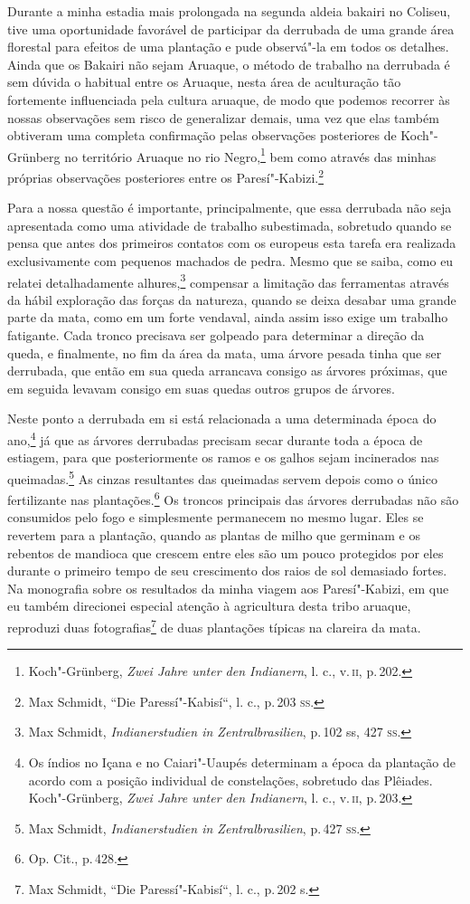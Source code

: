 Durante a minha estadia mais prolongada na segunda aldeia bakairi no
Coliseu, tive uma oportunidade favorável de participar da derrubada de
uma grande área florestal para efeitos de uma plantação e pude
observá"-la em todos os detalhes. Ainda que os Bakairi não sejam Aruaque,
o método de trabalho na derrubada é sem dúvida o habitual entre os
Aruaque, nesta área de aculturação tão fortemente influenciada pela
cultura aruaque, de modo que podemos recorrer às nossas observações sem
risco de generalizar demais, uma vez que elas também obtiveram uma
completa confirmação pelas observações posteriores de Koch"-Grünberg no
território Aruaque no rio Negro,\footnote{Koch"-Grünberg, \textit{Zwei Jahre
  unter den Indianern}, l. c., v.\,\textsc{ii}, p.\,202.} bem como através das
minhas próprias observações posteriores entre os Paresí"-Kabizi.\footnote{Max
  Schmidt, ``Die Paressí"-Kabisí``, l. c., p.\,203 \textsc{ss}.}

Para a nossa questão é importante, principalmente, que essa derrubada
não seja apresentada como uma atividade de trabalho subestimada,
sobretudo quando se pensa que antes dos primeiros contatos com os
europeus esta tarefa era realizada exclusivamente com pequenos machados
de pedra. Mesmo que se saiba, como eu relatei detalhadamente
alhures,\footnote{Max Schmidt, \textit{Indianerstudien in
  Zentralbrasilien}, p.\,102 ss, 427 \textsc{ss}.} compensar a limitação das
ferramentas através da hábil exploração das forças da natureza, quando
se deixa desabar uma grande parte da mata, como em um forte vendaval,
ainda assim isso exige um trabalho fatigante. Cada tronco precisava ser
golpeado para determinar a direção da queda, e finalmente, no fim da
área da mata, uma árvore pesada tinha que ser derrubada, que então em
sua queda arrancava consigo as árvores próximas, que em seguida levavam
consigo em suas quedas outros grupos de árvores.

Neste ponto a derrubada em si está relacionada a uma determinada época
do ano,\footnote{Os índios no Içana e no Caiari"-Uaupés determinam a época
  da plantação de acordo com a posição individual de constelações,
  sobretudo das Plêiades. Koch"-Grünberg, \textit{Zwei Jahre unter den
  Indianern}, l. c., v.\,\textsc{ii}, p.\,203.} já que as árvores derrubadas
precisam secar durante toda a época de estiagem, para que
posteriormente os ramos e os galhos sejam incinerados nas
queimadas.\footnote{Max Schmidt, \textit{Indianerstudien in
  Zentralbrasilien}, p.\,427 \textsc{ss}.} As cinzas resultantes das queimadas
servem depois como o único fertilizante nas plantações.\footnote{Op.
  Cit., p.\,428.} Os troncos principais das árvores derrubadas não são
consumidos pelo fogo e simplesmente permanecem no mesmo lugar. Eles se
revertem para a plantação, quando as plantas de milho que germinam e os
rebentos de mandioca que crescem entre eles são um pouco protegidos
por eles durante o primeiro tempo de seu crescimento dos raios de sol
demasiado fortes. Na monografia sobre os resultados da minha viagem aos
Paresí"-Kabizi, em que eu também direcionei especial atenção à
agricultura desta tribo aruaque, reproduzi duas fotografias\footnote{Max
  Schmidt, ``Die Paressí"-Kabisí``, l. c., p.\,202 s.} de duas plantações
típicas na clareira da mata.

